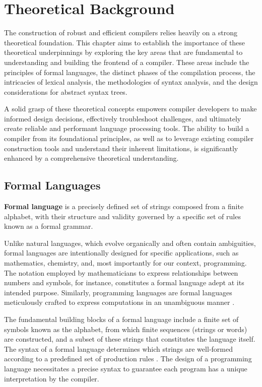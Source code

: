 \chapter{Theoretical Background}

The construction of robust and efficient compilers relies heavily on a strong theoretical foundation. This chapter aims to establish the importance of these theoretical underpinnings by exploring the key areas that are fundamental to understanding and building the frontend of a compiler. 
These areas include the principles of formal languages, the distinct phases of the compilation process, the intricacies of lexical analysis, the methodologies of syntax analysis, and the design considerations for abstract syntax trees. 

A solid grasp of these theoretical concepts empowers compiler developers to make informed design decisions, effectively troubleshoot challenges, and ultimately create reliable and performant language processing tools. The ability to build a compiler from its foundational principles, as well as to leverage existing compiler construction tools and understand their inherent limitations, is significantly enhanced by a comprehensive theoretical understanding.

\section{Formal Languages}

\begin{definition}
\textbf{Formal language} is a precisely defined set of strings composed from a finite alphabet, with their structure and validity governed by a specific set of rules known as a formal grammar\cite{aho2007compilers}.
\end{definition}

Unlike natural languages, which evolve organically and often contain ambiguities, formal languages are intentionally designed for specific applications, such as mathematics, chemistry, and, most importantly for our context, programming. The notation employed by mathematicians to express relationships between numbers and symbols, for instance, constitutes a formal language adept at its intended purpose. Similarly, programming languages are formal languages meticulously crafted to express computations in an unambiguous manner \cite{runestone-formal-natural-languages}.

The fundamental building blocks of a formal language include a finite set of symbols known as the alphabet, from which finite sequences (strings or words) are constructed, and a subset of these strings that constitutes the language itself. The syntax of a formal language determines which strings are well‑formed according to a predefined set of production rules \cite{aho2007compilers, runestone-formal-natural-languages}. The design of a programming language necessitates a precise syntax to guarantee each program has a unique interpretation by the compiler.

